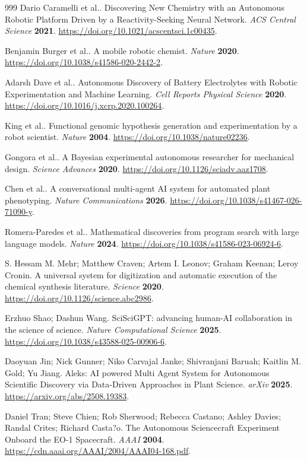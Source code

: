 \begin{thebibliography}{999}
Dario Caramelli et al..
Discovering New Chemistry with an Autonomous Robotic Platform Driven by a Reactivity-Seeking Neural Network.
\emph{ACS Central Science} \textbf{2021}.
\url{https://doi.org/10.1021/acscentsci.1c00435}.

Benjamin Burger et al..
A mobile robotic chemist.
\emph{Nature} \textbf{2020}.
\url{https://doi.org/10.1038/s41586-020-2442-2}.

Adarsh Dave et al..
Autonomous Discovery of Battery Electrolytes with Robotic Experimentation and Machine Learning.
\emph{Cell Reports Physical Science} \textbf{2020}.
\url{https://doi.org/10.1016/j.xcrp.2020.100264}.

King et al..
Functional genomic hypothesis generation and experimentation by a robot scientist.
\emph{Nature} \textbf{2004}.
\url{https://doi.org/10.1038/nature02236}.

Gongora et al..
A Bayesian experimental autonomous researcher for mechanical design.
\emph{Science Advances} \textbf{2020}.
\url{https://doi.org/10.1126/sciadv.aaz1708}.

Chen et al..
A conversational multi-agent AI system for automated plant phenotyping.
\emph{Nature Communications} \textbf{2026}.
\url{https://doi.org/10.1038/s41467-026-71090-y}.

Romera-Paredes et al..
Mathematical discoveries from program search with large language models.
\emph{Nature} \textbf{2024}.
\url{https://doi.org/10.1038/s41586-023-06924-6}.

S. Hessam M. Mehr; Matthew Craven; Artem I. Leonov; Graham Keenan; Leroy Cronin.
A universal system for digitization and automatic execution of the chemical synthesis literature.
\emph{Science} \textbf{2020}.
\url{https://doi.org/10.1126/science.abc2986}.

Erzhuo Shao; Dashun Wang.
SciSciGPT: advancing human-AI collaboration in the science of science.
\emph{Nature Computational Science} \textbf{2025}.
\url{https://doi.org/10.1038/s43588-025-00906-6}.

Daoyuan Jin; Nick Gunner; Niko Carvajal Janke; Shivranjani Baruah; Kaitlin M. Gold; Yu Jiang.
Aleks: AI powered Multi Agent System for Autonomous Scientific Discovery via Data-Driven Approaches in Plant Science.
\emph{arXiv} \textbf{2025}.
\url{https://arxiv.org/abs/2508.19383}.

Daniel Tran; Steve Chien; Rob Sherwood; Rebecca Castano; Ashley Davies; Randal Crites; Richard Casta?o.
The Autonomous Sciencecraft Experiment Onboard the EO-1 Spacecraft.
\emph{AAAI} \textbf{2004}.
\url{https://cdn.aaai.org/AAAI/2004/AAAI04-168.pdf}.


\end{thebibliography}
